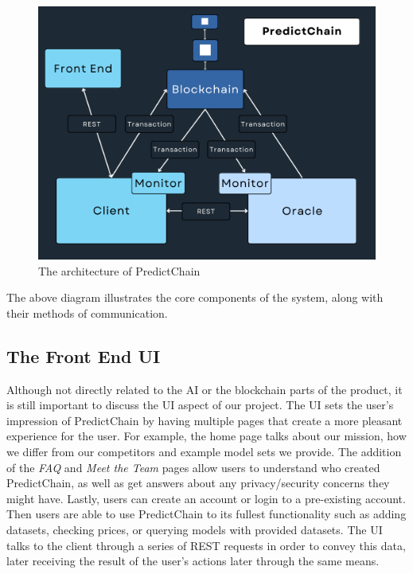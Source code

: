 \documentclass{article}
\begin{document}
    \begin{figure}[H]
        \begin{center}
            \begin{minipage}{0.6\textwidth}
            \centering
            \includegraphics[width=\linewidth]{../../img/detailedDiagram}
            \caption{The architecture of PredictChain}\label{Fig:detailedDiagram}
        \end{minipage}\hfill
        \end{center}
    \end{figure}

    The above diagram illustrates the core components of the system, along with their methods of communication.

    \subsection{The Front End UI}
    Although not directly related to the AI or the blockchain parts of the product, it is still important to discuss the
    UI aspect of our project. The UI sets the user's impression of PredictChain by having multiple pages that create a more
    pleasant experience for the user. For example, the home page talks about our mission, how we differ from our
    competitors and example model sets we provide. The addition of the \textit{FAQ} and \textit{Meet the Team} pages allow users to
    understand who created PredictChain, as well as get answers about any privacy/security concerns they might have.
    Lastly, users can create an account or login to a pre-existing account. Then users are able to use PredictChain
    to its fullest functionality such as adding datasets, checking prices, or querying models with provided datasets.
    The UI talks to the client through a series of REST requests in order to convey this data, later receiving the
    result of the user's actions later through the same means.
\end{document}
